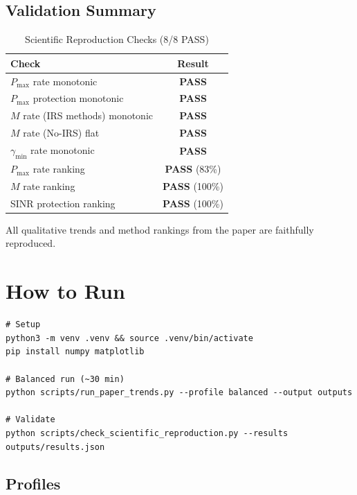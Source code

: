\documentclass[11pt,a4paper]{article}
\begin{document}
\subsection{Validation Summary}

\begin{table}[H]
\centering
\caption{Scientific Reproduction Checks (8/8 PASS)}
\begin{tabular}{lc}
\toprule
\textbf{Check} & \textbf{Result} \\
\midrule
$P_{\max}$ rate monotonic & \textcolor{green!60!black}{\textbf{PASS}} \\
$P_{\max}$ protection monotonic & \textcolor{green!60!black}{\textbf{PASS}} \\
$M$ rate (IRS methods) monotonic & \textcolor{green!60!black}{\textbf{PASS}} \\
$M$ rate (No-IRS) flat & \textcolor{green!60!black}{\textbf{PASS}} \\
$\gamma_{\min}$ rate monotonic & \textcolor{green!60!black}{\textbf{PASS}} \\
$P_{\max}$ rate ranking & \textcolor{green!60!black}{\textbf{PASS}} (83\%) \\
$M$ rate ranking & \textcolor{green!60!black}{\textbf{PASS}} (100\%) \\
SINR protection ranking & \textcolor{green!60!black}{\textbf{PASS}} (100\%) \\
\bottomrule
\end{tabular}
\end{table}

All qualitative trends and method rankings from the paper are faithfully reproduced.

\section{How to Run}

\begin{verbatim}
# Setup
python3 -m venv .venv && source .venv/bin/activate
pip install numpy matplotlib

# Balanced run (~30 min)
python scripts/run_paper_trends.py --profile balanced --output outputs

# Validate
python scripts/check_scientific_reproduction.py --results outputs/results.json
\end{verbatim}

\subsection{Profiles}
\end{document}
